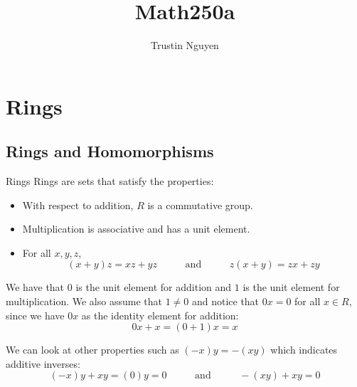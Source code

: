 \documentclass{report}
\title{Math250a}
\author{Trustin Nguyen}
\begin{document}

\begin{titlepage}
    \maketitle
\end{titlepage}
\tableofcontents
\restoregeometry

\reversemarginpar

\chapter{Rings}

\begin{topic}
    \section{Rings and Homomorphisms}
\end{topic}

\begin{definition}{Rings}
    Rings are sets that satisfy the properties:
        \begin{itemize}
            \item With respect to addition, $R$ is a commutative group.

            \item Multiplication is associative and has a unit element.

            \item For all $x, y, z$, 
                \begin{equation*}
                    (x + y)z = xz + yz \hspace{30pt} \text{ and } \hspace{30pt} z(x + y) = zx + zy
                \end{equation*}
        \end{itemize}
\end{definition}

We have that $0$ is the unit element for addition and $1$ is the unit element for multiplication. We also assume that $1 \neq 0$ and notice that $0x = 0$ for all $x \in R$, since we have $0x$ as the identity element for addition:
    \begin{equation*}
        0x + x = (0 + 1)x = x
    \end{equation*}

We can look at other properties such as $(-x)y = -(xy)$ which indicates additive inverses:
    \begin{equation*}
        (-x)y + xy = (0)y = 0 \hspace{30pt} \text{ and } \hspace{30pt} -(xy) + xy = 0
    \end{equation*}
\end{document}
